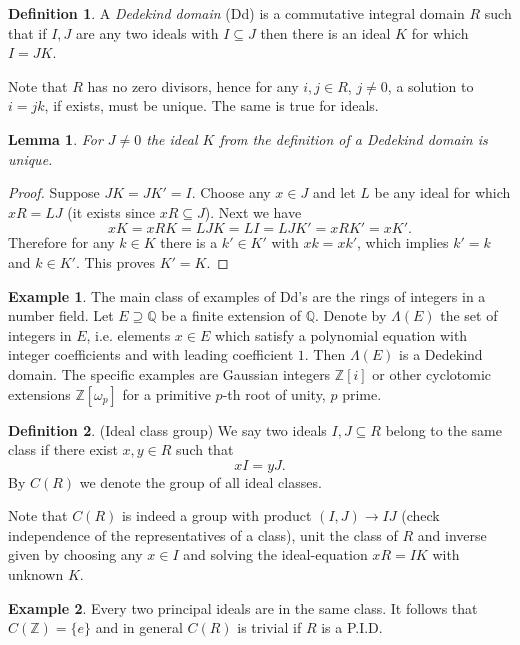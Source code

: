 \documentclass[a4paper,10pt]{article}
\theoremstyle{plain}%
\newtheorem{lem}[thm]{Lemma}
\theoremstyle{definition}
\newtheorem{defn}{Definition}
\newtheorem{exmp}{Example}
\theoremstyle{remark}
\newcommand{\ZZ}{\mathbb{Z}}
\newcommand{\QQ}{\mathbb{Q}}
\begin{document}
\begin{defn}
A \emph{Dedekind domain} (Dd) is a commutative integral domain $R$ such that if $I,J$ are any two ideals with $I\subseteq J$ then there is an ideal $K$ for which $I=JK$.
\end{defn}

Note that $R$ has no zero divisors, hence for any $i,j\in R$, $j\neq 0$, a solution to $i=jk$, if exists, must be unique. The same is true for ideals.

\begin{lem}
For $J\neq 0$ the ideal $K$ from the definition of a Dedekind domain is unique.
\end{lem}
\begin{proof}
Suppose $JK=JK'=I$. Choose any $x\in J$ and let $L$ be any ideal for which $xR=LJ$ (it exists since $xR\subseteq J$). Next we have
$$xK=xRK=LJK=LI=LJK'=xRK'=xK'.$$
Therefore for any $k\in K$ there is a $k'\in K'$ with $xk=xk'$, which implies $k'=k$ and $k\in K'$. This proves $K'=K$.
\end{proof}

\begin{exmp}
The main class of examples of Dd's are the rings of integers in a number field. Let $E\supseteq\QQ$ be a finite extension of $\QQ$. Denote by $\Lambda(E)$ the set of integers in $E$, i.e. elements $x\in E$ which satisfy a polynomial equation with integer coefficients and with leading coefficient $1$. Then $\Lambda(E)$ is a Dedekind domain. The specific examples are Gaussian integers $\ZZ[i]$ or other cyclotomic extensions $\ZZ[\omega_p]$ for a primitive $p$-th root of unity, $p$ prime.
\end{exmp}
\begin{defn}
(Ideal class group) We say two ideals $I,J\subseteq R$ belong to the same class if there exist $x,y\in R$ such that
$$xI=yJ.$$
By $C(R)$ we denote the group of all ideal classes.
\end{defn}

Note that $C(R)$ is indeed a group with product $(I,J)\to IJ$ (check independence of the representatives of a class), unit the class of $R$ and inverse given by choosing any $x\in I$ and solving the ideal-equation $xR=IK$ with unknown $K$.

\begin{exmp}
Every two principal ideals are in the same class. It follows that $C(\ZZ)=\{e\}$ and in general $C(R)$ is trivial if $R$ is a P.I.D.
\end{exmp}
\end{document}
